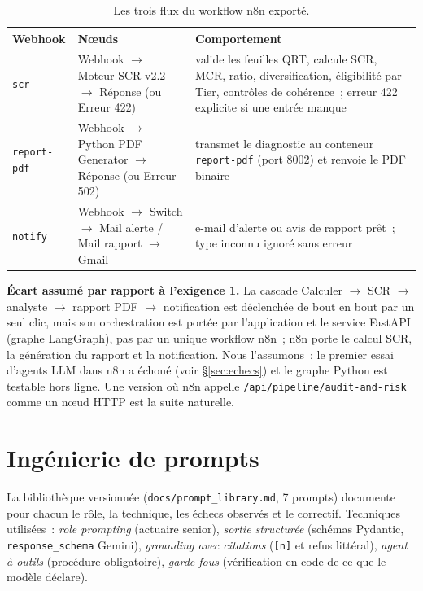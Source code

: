\documentclass[11pt,a4paper]{article}
\newcommand{\code}[1]{\texttt{\small #1}}
\begin{document}
\begin{table}[h]\centering\small
\begin{tabularx}{\textwidth}{@{}p{2.5cm}p{3.3cm}X@{}}\toprule
\textbf{Webhook} & \textbf{N\oe uds} & \textbf{Comportement}\\\midrule
\code{scr} & Webhook $\to$ Moteur SCR v2.2 $\to$ R\'eponse (ou Erreur 422) & valide les feuilles QRT, calcule SCR, MCR, ratio, diversification, \'eligibilit\'e par Tier, contr\^oles de coh\'erence~; erreur 422 explicite si une entr\'ee manque\\
\code{report-pdf} & Webhook $\to$ Python PDF Generator $\to$ R\'eponse (ou Erreur 502) & transmet le diagnostic au conteneur \code{report-pdf} (port 8002) et renvoie le PDF binaire\\
\code{notify} & Webhook $\to$ Switch $\to$ Mail alerte / Mail rapport $\to$ Gmail & e-mail d'alerte ou avis de rapport pr\^et~; type inconnu ignor\'e sans erreur\\\bottomrule
\end{tabularx}
\caption{Les trois flux du workflow n8n export\'e.}
\end{table}
\textbf{\'Ecart assum\'e par rapport \`a l'exigence 1.} La cascade \og Calculer $\to$ SCR $\to$ analyste $\to$ rapport PDF $\to$ notification\fg{} est d\'eclench\'ee de bout en bout par un seul clic, mais son orchestration est port\'ee par l'application et le service FastAPI (graphe LangGraph), pas par un unique workflow n8n~; n8n porte le calcul SCR, la g\'en\'eration du rapport et la notification. Nous l'assumons~: le premier essai d'agents LLM dans n8n a \'echou\'e (voir \S\ref{sec:echecs}) et le graphe Python est testable hors ligne. Une version o\`u n8n appelle \code{/api/pipeline/audit-and-risk} comme un n\oe ud HTTP est la suite naturelle.

\section{Ing\'enierie de prompts}
La biblioth\`eque versionn\'ee (\code{docs/prompt\_library.md}, 7 prompts) documente pour chacun le r\^ole, la technique, les \'echecs observ\'es et le correctif. Techniques utilis\'ees~: \emph{role prompting} (actuaire senior), \emph{sortie structur\'ee} (sch\'emas Pydantic, \code{response\_schema} Gemini), \emph{grounding avec citations} (\code{[n]} et refus litt\'eral), \emph{agent \`a outils} (proc\'edure obligatoire), \emph{garde-fous} (v\'erification en code de ce que le mod\`ele d\'eclare).
\end{document}
